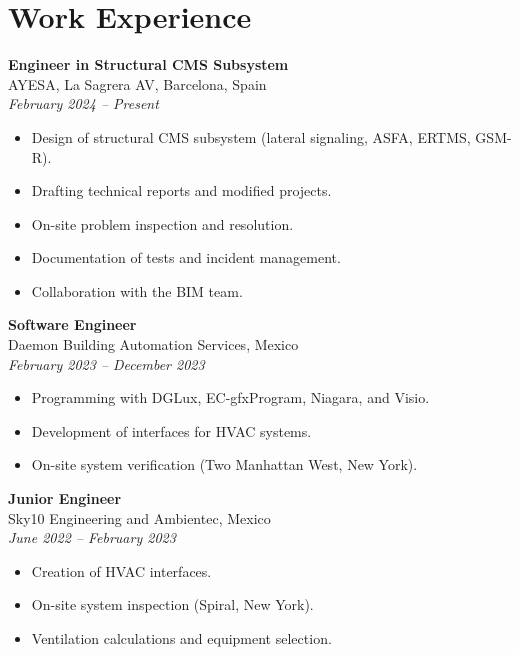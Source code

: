 \documentclass[11pt,a4paper]{article}
\begin{document}
\begin{minipage}[t]{0.65\textwidth}
\RaggedRight

\vspace*{-10em}

\section*{Work Experience}
\footnotesize

\textbf{Engineer in Structural CMS Subsystem} \\
AYESA, La Sagrera AV, Barcelona, Spain \\
\textit{February 2024 -- Present}
\begin{itemize}
    \item Design of structural CMS subsystem (lateral signaling, ASFA, ERTMS, GSM-R).
    \item Drafting technical reports and modified projects.
    \item On-site problem inspection and resolution.
    \item Documentation of tests and incident management.
    \item Collaboration with the BIM team.
\end{itemize}

\vspace{1em} %

\textbf{Software Engineer} \\
Daemon Building Automation Services, Mexico \\
\textit{February 2023 -- December 2023}
\begin{itemize}
    \item Programming with DGLux, EC-gfxProgram, Niagara, and Visio.
    \item Development of interfaces for HVAC systems.
    \item On-site system verification (Two Manhattan West, New York).
\end{itemize}

\vspace{1em} %

\textbf{Junior Engineer} \\
Sky10 Engineering and Ambientec, Mexico \\
\textit{June 2022 -- February 2023}
\begin{itemize}
    \item Creation of HVAC interfaces.
    \item On-site system inspection (Spiral, New York).
    \item Ventilation calculations and equipment selection.
\end{itemize}


\end{minipage}
\end{document}
